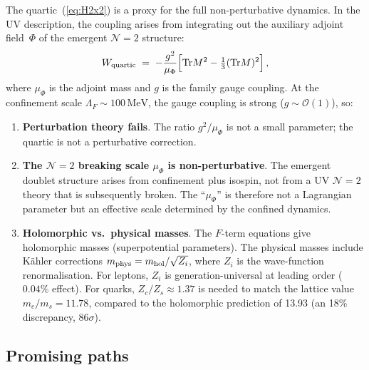 \documentclass[12pt,a4paper]{article}
\newcommand{\Tr}{\mathrm{Tr}}
\newcommand{\MeV}{\,\mathrm{MeV}}
\begin{document}
The quartic~(\ref{eq:H2x2}) is a proxy for the full non-perturbative
dynamics.  In the UV description, the coupling arises from integrating out
the auxiliary adjoint field~$\Phi$ of the emergent $\mathcal{N}{=}2$
structure:
\begin{equation}
  W_{\rm quartic} \;=\;
  -\frac{g^2}{\mu_\Phi}
  \Bigl[\Tr M^2 - \tfrac{1}{3}(\Tr M)^2\Bigr]\,,
\end{equation}
where $\mu_\Phi$ is the adjoint mass and $g$ is the family gauge coupling.
At the confinement scale $\Lambda_F \sim 100\MeV$, the gauge coupling
is strong ($g \sim \mathcal{O}(1)$), so:
\begin{enumerate}
\item \textbf{Perturbation theory fails}.  The ratio $g^2/\mu_\Phi$
  is not a small parameter; the quartic is not a perturbative correction.
\item \textbf{The $\mathcal{N}{=}2$ breaking scale $\mu_\Phi$ is
  non-perturbative}.  The emergent doublet structure arises from
  confinement plus isospin, not from a UV $\mathcal{N}{=}2$ theory
  that is subsequently broken.  The ``$\mu_\Phi$'' is therefore
  not a Lagrangian parameter but an effective scale determined by
  the confined dynamics.
\item \textbf{Holomorphic vs.\ physical masses}.  The $F$-term
  equations give holomorphic masses (superpotential parameters).
  The physical masses include K\"ahler corrections
  $m_{\rm phys} = m_{\rm hol}/\sqrt{Z_i}$, where $Z_i$ is the
  wave-function renormalisation.  For leptons,
  $Z_i$ is generation-universal at leading order ($0.04\%$ effect).
  For quarks, $Z_c/Z_s \approx 1.37$ is needed to match
  the lattice value $m_c/m_s = 11.78$, compared to the holomorphic
  prediction of 13.93 (an 18\% discrepancy, 86$\sigma$).
\end{enumerate}

\subsection{Promising paths}
\end{document}
